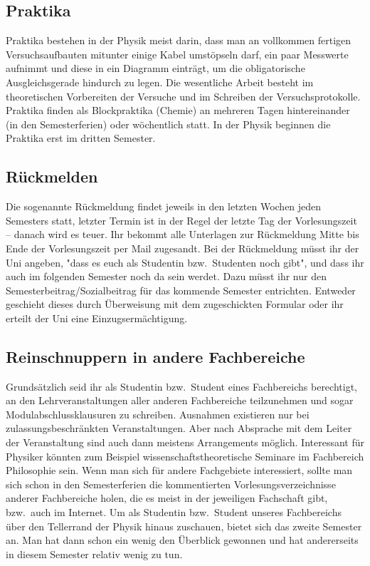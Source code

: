 \begin{multicols}{2}
\subsection*{Praktika}
Praktika bestehen in der Physik meist darin, dass man an vollkommen fertigen Versuchsaufbauten mitunter einige Kabel umstöpseln darf, ein paar Messwerte aufnimmt und diese in ein Diagramm einträgt, um die obligatorische Ausgleichsgerade hindurch zu legen. Die wesentliche Arbeit besteht im theoretischen Vorbereiten der Versuche und im Schreiben der Versuchsprotokolle. Praktika finden als Blockpraktika (Chemie) an mehreren Tagen hintereinander (in den Semesterferien) oder wöchentlich statt. In der Physik beginnen die Praktika erst im dritten Semester.

\subsection*{Rückmelden}
Die sogenannte Rückmeldung findet jeweils in den letzten Wochen jeden Semesters statt, letzter Termin ist in der Regel der letzte Tag der Vorlesungszeit -- danach wird es teuer. Ihr bekommt alle Unterlagen zur Rückmeldung Mitte bis Ende der Vorlesungszeit per Mail zugesandt. Bei der Rückmeldung müsst ihr der Uni angeben, "dass es euch als Studentin bzw.\ Studenten noch gibt", und dass ihr auch im folgenden Semester noch da sein werdet. Dazu müsst ihr nur den Semesterbeitrag/Sozialbeitrag für das kommende Semester entrichten. Entweder geschieht dieses durch Überweisung mit dem zugeschickten Formular oder ihr erteilt der Uni eine Einzugsermächtigung.

\subsection*{Reinschnuppern in andere Fachbereiche}
Grundsätzlich seid ihr als Studentin bzw.\ Student
eines Fachbereichs berechtigt, an den Lehrveranstaltungen aller anderen Fachbereiche teilzunehmen und sogar Modulabschlussklausuren zu schreiben. Ausnahmen existieren nur bei zulassungsbeschränkten Veranstaltungen. Aber nach Absprache mit dem Leiter der Veranstaltung sind auch dann meistens Arrangements möglich. Interessant für Physiker könnten zum Beispiel wissenschaftstheoretische Seminare im Fachbereich Philosophie sein. Wenn man sich für andere Fachgebiete interessiert, sollte man sich schon in den Semesterferien die kommentierten Vorlesungsverzeichnisse anderer Fachbereiche holen, die es meist in der jeweiligen Fachschaft gibt, bzw.\ auch im Internet. Um als Studentin bzw.\ Student unseres Fachbereichs über den Tellerrand der Physik hinaus zuschauen, bietet sich das zweite Semester an. Man hat dann schon ein wenig den Überblick gewonnen und hat andererseits in diesem Semester relativ wenig zu tun.

\end{multicols}

